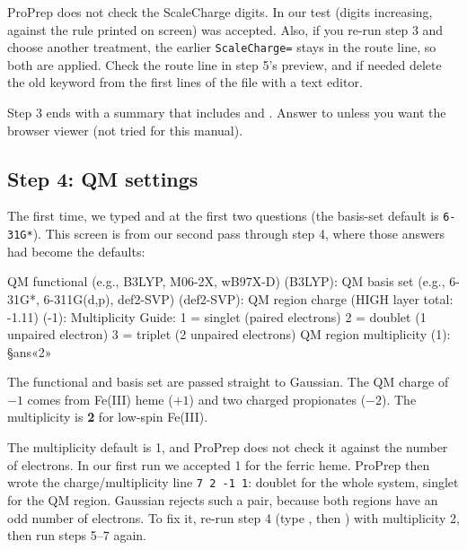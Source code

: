 \begin{watchout}
ProPrep does not check the ScaleCharge digits. In our test 
(digits increasing, against the rule printed on screen) was accepted. Also,
if you re-run step 3 and choose another treatment, the earlier
\texttt{ScaleCharge=} stays in the route line, so both are applied. Check the
route line in step 5's preview, and if needed delete the old keyword from the
first lines of the  file with a text editor.
\end{watchout}

Step 3 ends with a summary that includes
 and . Answer  to  unless you want the browser viewer (not tried for this manual).

\subsection*{Step 4: QM settings}

The first time, we typed  and  at the first two
questions (the basis-set default is \texttt{6-31G*}). This screen is from our
second pass through step 4, where those answers had become the defaults:

\begin{screen}
QM functional (e.g., B3LYP, M06-2X, wB97X-D) (B3LYP):
QM basis set (e.g., 6-31G*, 6-311G(d,p), def2-SVP) (def2-SVP):
QM region charge (HIGH layer total: -1.11) (-1):
Multiplicity Guide:
  1 = singlet (paired electrons)
  2 = doublet (1 unpaired electron)
  3 = triplet (2 unpaired electrons)
QM region multiplicity (1): §ans«2»
\end{screen}

The functional and basis set are passed straight to Gaussian. The QM charge
of $-1$ comes from Fe(III) heme ($+1$) and two charged propionates ($-2$).
The multiplicity is \textbf{2} for low-spin Fe(III).

\begin{watchout}
The multiplicity default is 1, and ProPrep does not check it against the
number of electrons. In our first run we accepted 1 for the ferric heme.
ProPrep then wrote the charge/multiplicity line \texttt{7 2 -1 1}: doublet for
the whole system, singlet for the QM region. Gaussian rejects such a pair,
because both regions have an odd number of electrons. To fix it, re-run step
4 (type , then ) with multiplicity 2, then run steps 5--7 again.
\end{watchout}

